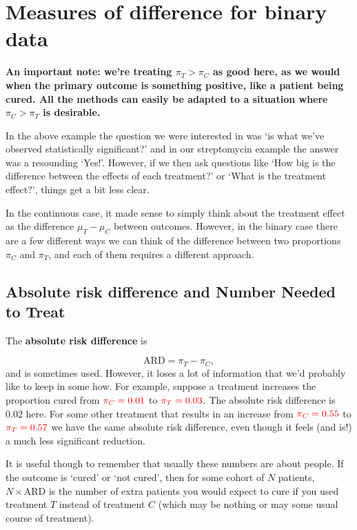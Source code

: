 \documentclass[
  openany]{book}
\theoremstyle{definition}
\theoremstyle{definition}
\theoremstyle{definition}
\theoremstyle{definition}
\theoremstyle{remark}
\begin{document}
\hypertarget{measures-of-difference-for-binary-data}{%
\section{Measures of difference for binary data}\label{measures-of-difference-for-binary-data}}

\textbf{An important note: we're treating \(\pi_T>\pi_C\) as good here, as we would when the primary outcome is something positive, like a patient being cured. All the methods can easily be adapted to a situation where \(\pi_C>\pi_T\) is desirable.}

In the above example the question we were interested in was `is what we've observed statistically significant?' and in our streptomycin example the answer was a resounding `Yes!'. However, if we then ask questions like `How big is the difference between the effects of each treatment?' or `What is the treatment effect?', things get a bit less clear.

In the continuous case, it made sense to simply think about the treatment effect as the difference \(\mu_T - \mu_C\) between outcomes. However, in the binary case there are a few different ways we can think of the difference between two proportions \(\pi_C\) and \(\pi_T\), and each of them requires a different approach.

\hypertarget{ard-and-nnt}{%
\subsection{Absolute risk difference and Number Needed to Treat}\label{ard-and-nnt}}

The \textbf{absolute risk difference} is

\[\text{ARD} = \pi_T - \pi_C,\]
and is sometimes used. However, it loses a lot of information that we'd probably like to keep in some how. For example, suppose a treatment increases the proportion cured from \(\color{red}{\pi_C=0.01}\) to \(\color{red}{\pi_T=0.03}\). The absolute risk difference is \(0.02\) here. For some other treatment that results in an increase from \(\color{red}{\pi_C=0.55}\) to \(\color{red}{\pi_T = 0.57}\) we have the same absolute risk difference, even though it feels (and is!) a much less significant reduction.

It is useful though to remember that usually these numbers are about people. If the outcome is `cured' or `not cured', then for some cohort of \(N\) patients, \(N\times\text{ARD}\) is the number of extra patients you would expect to cure if you used treatment \(T\) instead of treatment \(C\) (which may be nothing or may some usual course of treatment).
\end{document}
